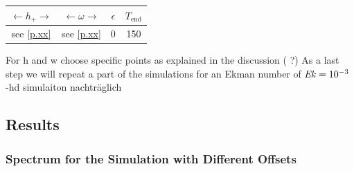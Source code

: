 \begin{center}
\vspace*{0.7ex}
\begin{tabular}{c|c|c|c}
$\leftarrow h_+ \rightarrow$ & $ \leftarrow  \omega \rightarrow $ & $\epsilon$ & $T_{\text{end}}$\\
\hline
 see \ref{p.xx} & see \ref{p.xx} & 0 & 150\\
\end{tabular}
\vspace*{0.7ex}
\end{center}

For h and w choose specific points as explained in the discussion ( ?)
As a last step we will repeat a part of the simulations for an Ekman number of $\mbox{\textit{Ek}} = 10^{-3}$
-hd simulaiton nachträglich

\clearpage

\subsection{Results}
\subsubsection{Spectrum for the Simulation with Different Offsets}

